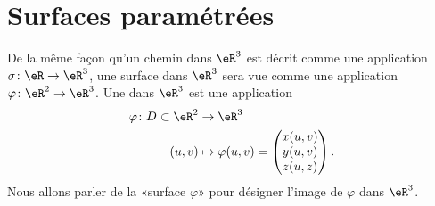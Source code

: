 
\section{Surfaces paramétrées}

De la même façon qu'un chemin dans \( \eR^3\) est décrit comme une application \( \sigma\colon \eR\to \eR^3\), une surface dans \( \eR^3\) sera vue comme une application \( \varphi\colon \eR^2\to \eR^3\). Une  dans \( \eR^3\) est une application
\begin{equation}
	\begin{aligned}
		\varphi\colon D\subset\eR^2 & \to \eR^3                           \\
		(u,v)                       & \mapsto \varphi(u,v)=\begin{pmatrix}
			                                                   x(u,v) \\
			                                                   y(u,v) \\
			                                                   z(u,z)
		                                                   \end{pmatrix}.
	\end{aligned}
\end{equation}
Nous allons parler de la «surface \( \varphi\)» pour désigner l'image de \( \varphi\) dans \( \eR^3\).

